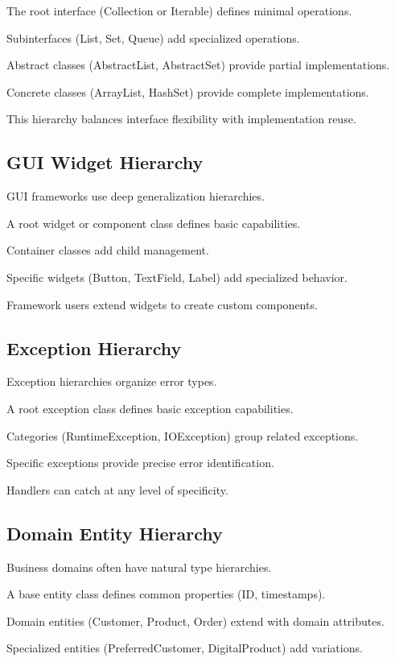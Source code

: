 \documentclass[11pt]{article}
\begin{document}
The root interface (Collection or Iterable) defines minimal operations.

Subinterfaces (List, Set, Queue) add specialized operations.

Abstract classes (AbstractList, AbstractSet) provide partial implementations.

Concrete classes (ArrayList, HashSet) provide complete implementations.

This hierarchy balances interface flexibility with implementation reuse.

\subsection{GUI Widget Hierarchy}

GUI frameworks use deep generalization hierarchies.

A root widget or component class defines basic capabilities.

Container classes add child management.

Specific widgets (Button, TextField, Label) add specialized behavior.

Framework users extend widgets to create custom components.

\subsection{Exception Hierarchy}

Exception hierarchies organize error types.

A root exception class defines basic exception capabilities.

Categories (RuntimeException, IOException) group related exceptions.

Specific exceptions provide precise error identification.

Handlers can catch at any level of specificity.

\subsection{Domain Entity Hierarchy}

Business domains often have natural type hierarchies.

A base entity class defines common properties (ID, timestamps).

Domain entities (Customer, Product, Order) extend with domain attributes.

Specialized entities (PreferredCustomer, DigitalProduct) add variations.
\end{document}
